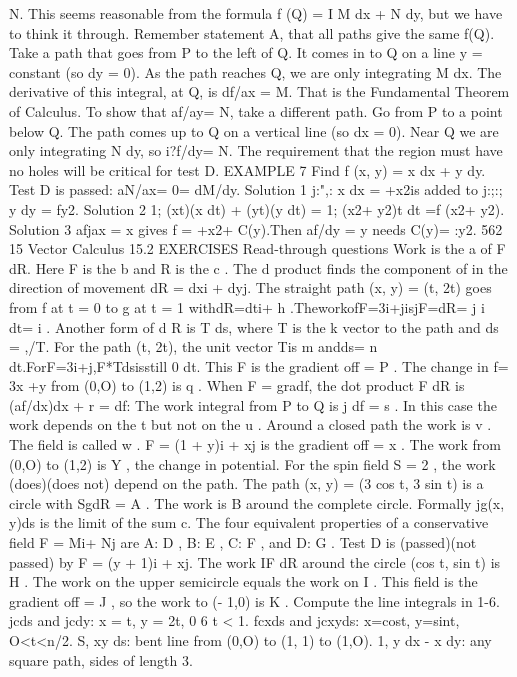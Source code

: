 N. This seems reasonable from the formula f (Q) = I M dx + N dy, but we have to
think it through.
Remember statement A, that all paths give the same f(Q). Take a path that goes
from P to the left of Q. It comes in to Q on a line y = constant (so dy = 0). As the
path reaches Q, we are only integrating M dx. The derivative of this integral, at Q, is
df/ax = M. That is the Fundamental Theorem of Calculus.
To show that af/ay= N, take a different path. Go from P to a point below Q. The
path comes up to Q on a vertical line (so dx = 0). Near Q we are only integrating
N dy, so i?f/dy= N.
The requirement that the region must have no holes will be critical for test D.
EXAMPLE 7 Find f (x, y) = x dx + y dy. Test D is passed: aN/ax= 0= dM/dy.
Solution 1 j:",: x dx = +x2is added to j:;:; y dy = fy2.
Solution 2 1; (xt)(x dt) + (yt)(y dt) = 1; (x2+ y2)t dt =f (x2+ y2).
Solution 3 afjax = x gives f = +x2+ C(y).Then af/dy = y needs C(y)= :y2. 
562 15 Vector Calculus
15.2 EXERCISES
Read-through questions
Work is the a of F dR. Here F is the b and R is
the c . The d product finds the component of
in the direction of movement dR = dxi + dyj. The straight
path (x, y) = (t, 2t) goes from f at t = 0 to g at t =
1 withdR=dti+ h .TheworkofF=3i+jisjF=dR=
j i dt= i .
Another form of d R is T ds, where T is the k vector to
the path and ds = ,/T. For the path (t, 2t), the unit vector
Tis m andds= n dt.ForF=3i+j,F*Tdsisstill
0 dt. This F is the gradient off = P . The change in
f= 3x +y from (0,O) to (1,2) is q .
When F = gradf, the dot product F dR is (af/dx)dx + r = df: The work integral from P to Q is j df = s . In this case the work depends on the t but not on the
u . Around a closed path the work is v . The field is
called w . F = (1 + y)i + xj is the gradient off = x .
The work from (0,O) to (1,2) is Y , the change in potential.
For the spin field S = 2 , the work (does)(does not)
depend on the path. The path (x, y) = (3 cos t, 3 sin t) is a
circle with SgdR = A . The work is B around the
complete circle. Formally jg(x, y)ds is the limit of the sum
c.
The four equivalent properties of a conservative field F =
Mi+ Nj are A: D , B: E , C: F , and D: G . Test D is (passed)(not passed) by F = (y + 1)i + xj. The work
IF dR around the circle (cos t, sin t) is H . The work on
the upper semicircle equals the work on I . This field is
the gradient off = J , so the work to (- 1,0) is K .
Compute the line integrals in 1-6.
jcds and jcdy: x = t, y = 2t, 0 6 t < 1.
fcxds and jcxyds: x=cost, y=sint, O<t<n/2.
S, xy ds: bent line from (0,O) to (1, 1) to (1,O).
1, y dx - x dy: any square path, sides of length 3.
